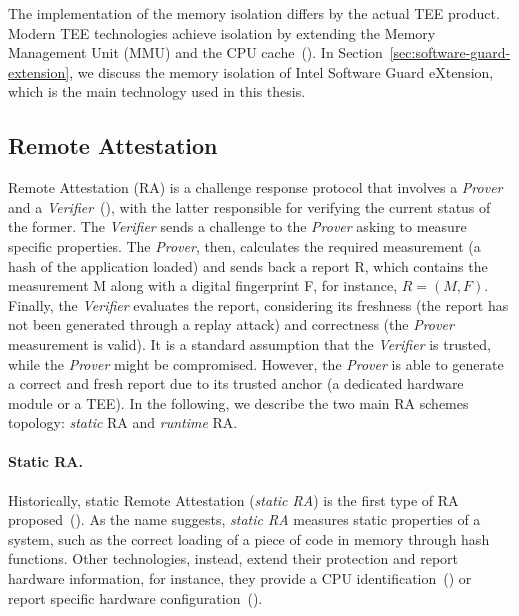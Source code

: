The implementation of the memory isolation differs by the actual TEE product.
Modern TEE technologies achieve isolation by extending the Memory Management 
Unit (MMU) and the CPU 
cache~(\cite{winter2008trusted,gilmont1999enhancing,rozas2013intel}).
In Section~\ref{sec:software-guard-extension}, we discuss the memory isolation 
of Intel Software Guard eXtension, which is the main technology 
used in this thesis.
                 

\subsection{Remote Attestation}
\label{ssec:remote-attestation}

Remote Attestation (RA) is a challenge response protocol that involves a 
\emph{Prover} and a \emph{Verifier}~(\cite{bajikar2002trusted}), with the 
latter responsible for verifying the current status of the former. 
The \emph{Verifier} sends a challenge to the \emph{Prover} asking to 
measure specific properties. The \emph{Prover}, then, calculates the required 
measurement (\eg a hash of the application loaded) and sends back a report R, 
which contains the measurement M along with a digital fingerprint F, for 
instance, $R = (M,F)$. Finally, the \emph{Verifier} evaluates the report, 
considering its freshness (\ie the report has not been generated through a 
replay attack) and correctness (\ie the \emph{Prover} measurement is valid). It 
is a standard assumption that the \emph{Verifier} is trusted, while the 
\emph{Prover} 
might be compromised. However, the \emph{Prover} is able to generate a correct 
and fresh report due to its trusted anchor (\eg a dedicated hardware module or 
a TEE).
In the following, we describe the two main RA schemes topology: 
\emph{static} RA and \emph{runtime} RA.

\paragraph{Static RA.}
Historically, static Remote Attestation (\emph{static RA}) is the first type of 
RA proposed~(\cite{bajikar2002trusted}).
As the name suggests, \emph{static RA} measures static properties of a system, 
such as the correct loading of a piece of code in memory through hash functions.
Other technologies, instead, extend their protection and report hardware 
information, for instance, they provide a CPU 
identification~(\cite{anati2013innovative}) or report specific hardware 
configuration~(\cite{sailer2004design}).


